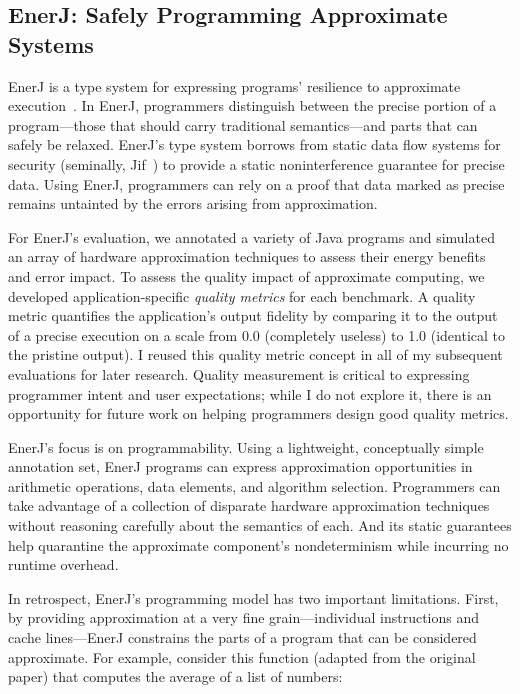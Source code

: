 \subsection{EnerJ: Safely Programming Approximate Systems}
\label{sec:prelim:enerj}

EnerJ is a type system for expressing programs' resilience to approximate
execution~\cite{enerj}. In EnerJ, programmers distinguish between the precise
portion of a program---those that should carry traditional semantics---and
parts that can safely be relaxed. EnerJ's type system borrows from static data
flow systems for security (seminally, Jif~\cite{jif}) to provide a static
noninterference guarantee for precise data. Using EnerJ, programmers can rely
on a proof that data marked as precise remains untainted by the errors arising
from approximation.

For EnerJ's evaluation, we annotated a variety of Java
programs and simulated an array of hardware approximation techniques to assess
their energy benefits and error impact. To assess the quality impact of
approximate computing, we developed application-specific \emph{quality
metrics} for each benchmark. A quality metric quantifies the application's
output fidelity by comparing it to the output of a precise execution on a
scale from 0.0 (completely useless) to 1.0 (identical to the pristine output).
I reused this quality metric concept in all of my subsequent evaluations for
later research. Quality measurement is critical to expressing programmer
intent and user expectations; while I do not explore it, there is an
opportunity for future work on helping programmers design good quality
metrics.

EnerJ's focus is on programmability. Using a lightweight, conceptually simple
annotation set, EnerJ programs can express approximation opportunities in
arithmetic operations, data elements, and algorithm selection. Programmers can
take advantage of a collection of disparate hardware approximation techniques
without reasoning carefully about the semantics of each. And its static
guarantees help quarantine the approximate component's nondeterminism while
incurring no runtime overhead.

In retrospect, EnerJ's programming model has two important limitations. First,
by providing approximation at a very fine grain---individual instructions and
cache lines---EnerJ constrains the parts of a program that can be
considered approximate. For example, consider this function (adapted from the original
paper) that computes the average of a list of numbers:

